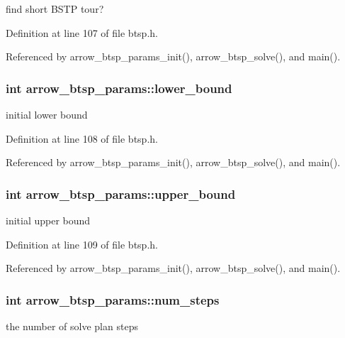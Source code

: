 find short BSTP tour? 

Definition at line 107 of file btsp.h.

Referenced by arrow\_\-btsp\_\-params\_\-init(), arrow\_\-btsp\_\-solve(), and main().\hypertarget{structarrow__btsp__params_da747e3797f9327834e4dbb1459d2786}{
\subsubsection{\setlength{\rightskip}{0pt plus 5cm}int {\bf arrow\_\-btsp\_\-params::lower\_\-bound}}}
\label{structarrow__btsp__params_da747e3797f9327834e4dbb1459d2786}


initial lower bound 

Definition at line 108 of file btsp.h.

Referenced by arrow\_\-btsp\_\-params\_\-init(), arrow\_\-btsp\_\-solve(), and main().\hypertarget{structarrow__btsp__params_b8749004215015a78139b8e4e1fb8905}{
\subsubsection{\setlength{\rightskip}{0pt plus 5cm}int {\bf arrow\_\-btsp\_\-params::upper\_\-bound}}}
\label{structarrow__btsp__params_b8749004215015a78139b8e4e1fb8905}


initial upper bound 

Definition at line 109 of file btsp.h.

Referenced by arrow\_\-btsp\_\-params\_\-init(), arrow\_\-btsp\_\-solve(), and main().\hypertarget{structarrow__btsp__params_2897d24f2fdd53c723609cf68880f55e}{
\subsubsection{\setlength{\rightskip}{0pt plus 5cm}int {\bf arrow\_\-btsp\_\-params::num\_\-steps}}}
\label{structarrow__btsp__params_2897d24f2fdd53c723609cf68880f55e}


the number of solve plan steps 

